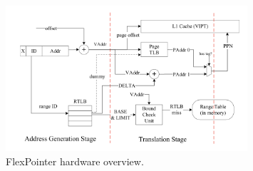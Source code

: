 \begin{figure}[h]
  \includegraphics[width=0.8\textwidth]{flexpointer.png}
  \caption{FlexPointer\cite{chen_flexpointer_2023} hardware overview.}
  \label{fig:FlexPointer}
\end{figure}



